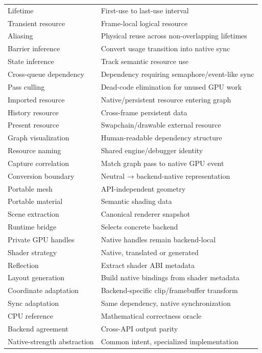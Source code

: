 {\begin{longtable}[]{@{}
  >{\raggedright\arraybackslash}p{}
  >{\raggedright\arraybackslash}p{}@{}}
Lifetime & First-use to last-use interval \\
Transient resource & Frame-local logical resource \\
Aliasing & Physical reuse across non-overlapping lifetimes \\
Barrier inference & Convert usage transition into native sync \\
State inference & Track semantic resource use \\
Cross-queue dependency & Dependency requiring semaphore/event-like sync \\
Pass culling & Dead-code elimination for unused GPU work \\
Imported resource & Native/persistent resource entering graph \\
History resource & Cross-frame persistent data \\
Present resource & Swapchain/drawable external resource \\
Graph visualization & Human-readable dependency structure \\
Resource naming & Shared engine/debugger identity \\
Capture correlation & Match graph pass to native GPU event \\
Conversion boundary & Neutral → backend-native representation \\
Portable mesh & API-independent geometry \\
Portable material & Semantic shading data \\
Scene extraction & Canonical renderer snapshot \\
Runtime bridge & Selects concrete backend \\
Private GPU handles & Native handles remain backend-local \\
Shader strategy & Native, translated or generated \\
Reflection & Extract shader ABI metadata \\
Layout generation & Build native bindings from shader metadata \\
Coordinate adaptation & Backend-specific clip/framebuffer transform \\
Sync adaptation & Same dependency, native synchronization \\
CPU reference & Mathematical correctness oracle \\
Backend agreement & Cross-API output parity \\
Native-strength abstraction & Common intent, specialized implementation \\
\end{longtable}
}

